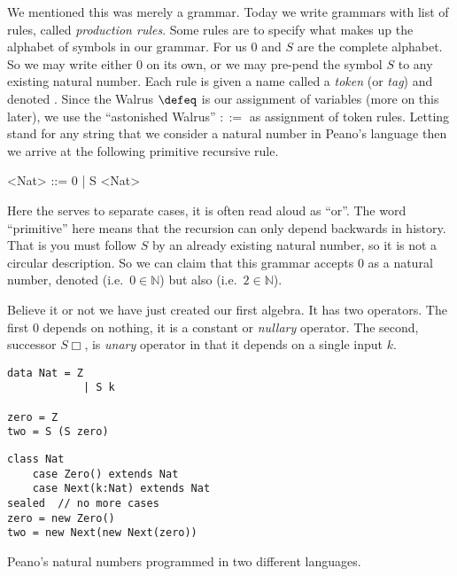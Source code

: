 We mentioned this was merely a grammar.  Today we write grammars with 
list of rules, called \emph{production rules}.  Some rules are to specify 
what makes up the alphabet of symbols in our grammar.  For us $0$ and $S$
are the complete alphabet.  So we may write either $0$ on its own, or 
we may pre-pend the symbol $S$ to any existing natural number.  
Each rule is given a name called a \emph{token} (or \emph{tag}) and 
denoted . Since the Walrus
$\defeq$ is our assignment of variables (more on this later), 
we use the ``astonished Walrus'' $::=$
as assignment of token rules. 
Letting 
 stand for any string that we consider a natural number 
in Peano's language then we arrive at the following primitive recursive rule.
\begin{center}
\begin{gcode}[]
<Nat> ::= 0 | S <Nat>
\end{gcode}
\end{center}
Here the \code{|} serves to separate cases, it is often read aloud as ``or''.
The word ``primitive'' here means that the recursion can only depend backwards 
in history. That is you must follow $S$ by an already existing natural number,
so it is not a circular description.
So we can claim that this grammar accepts $0$ as a natural number, denoted 
 (i.e.\ $0\in\mathbb{N}$) but also  (i.e.\ $2\in \mathbb{N}$).

Believe it or not we have just created our first algebra.  It has two 
operators.  The first $0$ depends on nothing, it is a constant or 
\emph{nullary} operator.  The second, successor $S\Box$, is \emph{unary} operator
in that it depends on a single input $k$. 


\begin{lstfloat}
\begin{center}
\begin{minipage}{0.4\textwidth}
\begin{lstlisting}[language=Hidris]
data Nat = Z 
            | S k

zero = Z
two = S (S zero)
\end{lstlisting}
\end{minipage}
\hfill
\begin{minipage}{0.55\textwidth}
\begin{lstlisting}[language=Sava]
class Nat
    case Zero() extends Nat
    case Next(k:Nat) extends Nat
sealed  // no more cases
zero = new Zero()
two = new Next(new Next(zero))
\end{lstlisting}
\end{minipage}
\end{center}
\caption{Peano's natural numbers programmed in two different languages.}
\label{lst:peano}
\end{lstfloat}
    
